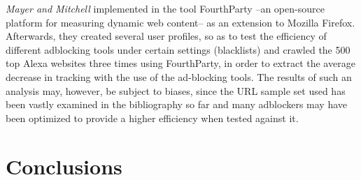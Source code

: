 \documentclass{sig-alternate}
\begin{document}
\textit{Mayer and Mitchell} implemented in \cite{mayer} the tool FourthParty --an open-source platform for measuring dynamic web content-- as an extension to Mozilla Firefox. Afterwards, they created several user profiles, so as to test the efficiency of different adblocking tools under certain settings (blacklists) and crawled the 500 top Alexa websites three times using FourthParty, in order to extract the average decrease in tracking with the use of the ad-blocking tools. The results of such an analysis may, however, be subject to biases, since the URL sample set used has been vastly examined in the bibliography so far and many adblockers may have been optimized to provide a higher efficiency when tested against it.


\section{Conclusions} \label{sec:conclusions}



\end{document}
